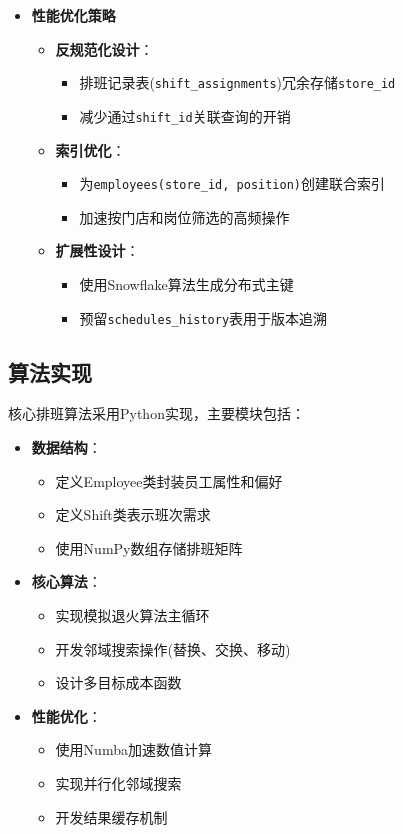 \documentclass{ctexart}
\begin{document}
\begin{itemize}
    \item \textbf{性能优化策略}
    \begin{itemize}
        \item \textbf{反规范化设计}：
        \begin{itemize}
            \item 排班记录表(\texttt{shift\_assignments})冗余存储\texttt{store\_id}
            \item 减少通过\texttt{shift\_id}关联查询的开销
        \end{itemize}
        
        \item \textbf{索引优化}：
        \begin{itemize}
            \item 为\texttt{employees(store\_id, position)}创建联合索引
            \item 加速按门店和岗位筛选的高频操作
        \end{itemize}
        
        \item \textbf{扩展性设计}：
        \begin{itemize}
            \item 使用Snowflake算法生成分布式主键
            \item 预留\texttt{schedules\_history}表用于版本追溯
        \end{itemize}
    \end{itemize}
\end{itemize}


\subsection{算法实现}
核心排班算法采用Python实现，主要模块包括：

\begin{itemize}
    \item \textbf{数据结构}：
    \begin{itemize}
        \item 定义Employee类封装员工属性和偏好
        \item 定义Shift类表示班次需求
        \item 使用NumPy数组存储排班矩阵
    \end{itemize}

    \item \textbf{核心算法}：
    \begin{itemize}
        \item 实现模拟退火算法主循环
        \item 开发邻域搜索操作(替换、交换、移动)
        \item 设计多目标成本函数
    \end{itemize}

    \item \textbf{性能优化}：
    \begin{itemize}
        \item 使用Numba加速数值计算
        \item 实现并行化邻域搜索
        \item 开发结果缓存机制
    \end{itemize}
\end{itemize}
\end{document}
